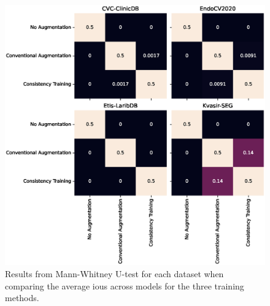 \begin{figure}[htb]
    \centering
    \includegraphics[width=\linewidth]{illustrations/ensemble_relative_pvals.eps}
    \caption[Mann-Whitney U-test results ensembles]{Results from Mann-Whitney U-test for each dataset when comparing the average \glspl{iou} across models for the three training methods. }
    \label{fig:ttest_training_methods_ensembles}
\end{figure}

